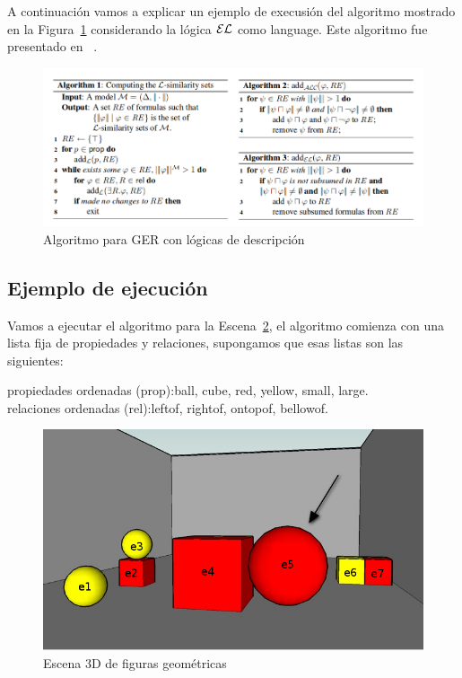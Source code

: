 A continuaci\'on vamos a explicar un ejemplo de execusi\'on del
algoritmo mostrado en la Figura~\ref{algoritmoOriginal} considerando la l\'ogica 
$\mathcal{EL}$ como language. Este algoritmo fue presentado en
~\cite{arec2:2008:Areces}.

\begin{figure}[h!]
\begin{center}
\includegraphics[width=\textwidth]{images/algoritmoOriginal.png}
\end{center}
\vspace*{-2em}
\caption{Algoritmo para GER con l\'ogicas de descripci\'on}
\label{algoritmoOriginal}
\end{figure}

\subsection{Ejemplo de ejecuci\'on}


Vamos a ejecutar el algoritmo para la Escena~\ref{figure22},
el algoritmo comienza con una lista fija de propiedades y relaciones, supongamos que
esas listas son las siguientes:

propiedades ordenadas (prop):\textsf{ball}, \textsf{cube}, \textsf{red}, \textsf{yellow}, \textsf{small}, \textsf{large}.\\
relaciones ordenadas (rel):\textsf{leftof}, \textsf{rightof}, \textsf{ontopof}, \textsf{bellowof}.

\begin{figure}
\begin{center}	
\includegraphics[width=.5\textwidth]{images/22.jpg}
\end{center}
\vspace*{-1.5em}
\caption{Escena 3D de figuras geom\'etricas}\label{figure22}
\end{figure}

